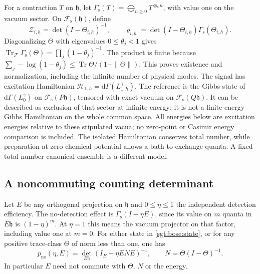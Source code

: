 \documentclass[aps,pra,reprint,superscriptaddress,longbibliography]{revtex4-2}
\newcommand{\Tr}{\operatorname{Tr}}
\begin{document}
For a contraction $T$ on $\mathfrak h$, let
$\Gamma_{\mathrm s}(T)=\bigoplus_{n\ge0}T^{\otimes_{\mathrm s}n}$,
with value one on the vacuum sector.  On
$\mathcal F_{\mathrm s}(\mathfrak h)$, define
\begin{equation}
 \mathcal Z_{i,h}=\det(I-\Theta_{i,h})^{-1},\qquad
 \varrho_{i,h}=\det(I-\Theta_{i,h})\Gamma_{\mathrm s}(\Theta_{i,h}).
 \label{sgt:bose:state}
\end{equation}
Diagonalizing $\Theta$ with eigenvalues $0\le\theta_j<1$ gives
$\Tr_{\mathcal F}\Gamma_{\mathrm s}(\Theta)=\prod_j(1-\theta_j)^{-1}$.
The product is finite because
$\sum_j-\log(1-\theta_j)\le\Tr\Theta/(1-\|\Theta\|)$.
This proves existence and normalization, including the infinite number
of physical modes.  The signal has excitation Hamiltonian
$\mathcal H_{1,h}=\mathrm d\Gamma(L_{1,h}^{\gamma})$.
The reference is the Gibbs state of $\mathrm d\Gamma(L_0^\gamma)$ on
$\mathcal F_{\mathrm s}(P\mathfrak h)$, tensored with exact vacuum on
$\mathcal F_{\mathrm s}(Q\mathfrak h)$.  It can be described as exclusion
of that sector at infinite energy; it is not a finite-energy Gibbs
Hamiltonian on the whole common space.  All energies below are excitation
energies relative to these stipulated vacua; no zero-point or Casimir
energy comparison is included.  The isolated Hamiltonian conserves total
number, while preparation at zero chemical potential allows a bath to
exchange quanta.  A fixed-total-number canonical ensemble is a different
model.

\subsection{A noncommuting counting determinant}
\label{sgt:bose:determinant-section}

Let $E$ be any orthogonal projection on $\mathfrak h$ and
$0\le\eta\le1$ the independent detection efficiency.  The no-detection
effect is $\Gamma_{\mathrm s}(I-\eta E)$, since its value on $m$ quanta
in $E\mathfrak h$ is $(1-\eta)^m$.  At $\eta=1$ this means the vacuum
projector on that factor, including value one at $m=0$.
For either state in \eqref{sgt:bose:state}, or for any positive
trace-class $\Theta$ of norm less than one, one has
\begin{equation}
 p_{\mathrm{no}}(\eta,E)
 =\det_{E\mathfrak h}(I_E+\eta ENE)^{-1},
 \qquad N=\Theta(I-\Theta)^{-1}.
 \label{sgt:bose:no-click}
\end{equation}
In particular $E$ need not commute with $\Theta$, $N$ or the energy.
\end{document}
